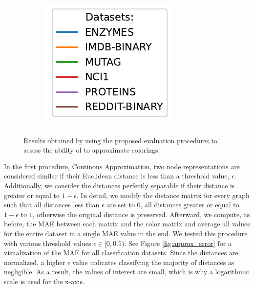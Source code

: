 \begin{figure}[!htb]
\begin{subfigure}[t]{0.2\textwidth}
{			\includegraphics[width=\textwidth]{Figures/global_error_legend.pdf}
		}
	\end{subfigure}
	\caption{Results obtained by using the proposed evaluation procedures to assess the ability of \gnns to approximate \wl colorings.}
	\label{fig:approx_eval}
\end{figure}

In the first procedure, Continous Approximation, two node representations are considered similar if their Euclidean distance is less than a threshold value, $\epsilon$. Additionally, we consider the distances perfectly separable if their distance is greater or equal to $1 - \epsilon$. In detail, we modify the \gnn distance matrix for every graph such that all distances less than $\epsilon$ are set to $0$, all distances greater or equal to $1 - \epsilon$ to $1$, otherwise the original distance is preserved. Afterward, we compute, as before, the MAE between each \gnn matrix and the \wl color matrix and average all values for the entire dataset in a single MAE value in the end. We tested this procedure with various threshold values $\epsilon \in [0, 0.5)$. See Figure \ref{fig:approx_error} for a visualization of the MAE for all classification datasets. Since the distances are normalized, a higher $\epsilon$ value indicates classifying the majority of distances as negligible. As a result, the values of interest are small, which is why a logarithmic scale is used for the x-axis.

